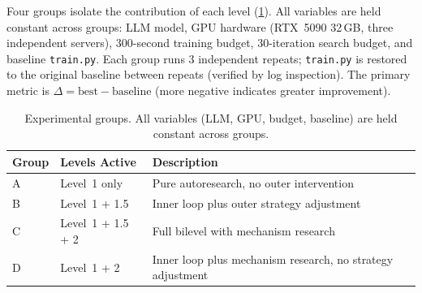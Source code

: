 Four groups isolate the contribution of each level (\cref{tab:groups}).
All variables are held constant across groups: LLM model, GPU hardware
(RTX~5090 32\,GB, three independent servers), 300-second training budget,
30-iteration search budget, and baseline \texttt{train.py}.
Each group runs 3 independent repeats; \texttt{train.py} is restored to the
original baseline between repeats (verified by log inspection).
The primary metric is $\Delta = \text{best} - \text{baseline}$ \valbpb{}
(more negative indicates greater improvement).

\begin{table}[!htbp]
\centering
\caption{Experimental groups. All variables (LLM, GPU, budget, baseline) are held constant across groups.}
\label{tab:groups}
\begin{tabular}{@{}lll@{}}
\toprule
Group & Levels Active & Description \\
\midrule
A & Level~1 only & Pure autoresearch, no outer intervention \\
B & Level~1 + 1.5 & Inner loop plus outer strategy adjustment \\
C & Level~1 + 1.5 + 2 & Full bilevel with mechanism research \\
D & Level~1 + 2 & Inner loop plus mechanism research, no strategy adjustment \\
\bottomrule
\end{tabular}
\end{table}

